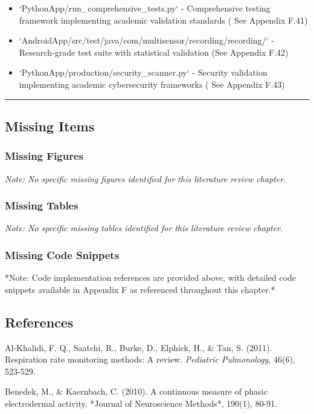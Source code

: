 \documentclass[12pt,a4paper]{article}
\begin{document}
\begin{itemize}
\item `PythonApp/run_comprehensive_tests.py` - Comprehensive testing framework implementing academic validation standards (
  See Appendix F.41)
\item `AndroidApp/src/test/java/com/multisensor/recording/recording/` - Research-grade test suite with statistical
  validation (See Appendix F.42)
\item `PythonApp/production/security_scanner.py` - Security validation implementing academic cybersecurity frameworks (
  See Appendix F.43)

\end{itemize}
\hrule

\subsection{Missing Items}

\subsubsection{Missing Figures}

\textit{Note: No specific missing figures identified for this literature review chapter.}

\subsubsection{Missing Tables}

\textit{Note: No specific missing tables identified for this literature review chapter.}

\subsubsection{Missing Code Snippets}

*Note: Code implementation references are provided above, with detailed code snippets available in Appendix F as
referenced throughout this chapter.*

\subsection{References}

Al-Khalidi, F. Q., Saatchi, R., Burke, D., Elphick, H., \& Tan, S. (2011). Respiration rate monitoring methods: A review.
\textit{Pediatric Pulmonology}, 46(6), 523-529.

Benedek, M., \& Kaernbach, C. (2010). A continuous measure of phasic electrodermal activity. *Journal of Neuroscience
Methods*, 190(1), 80-91.
\end{document}
